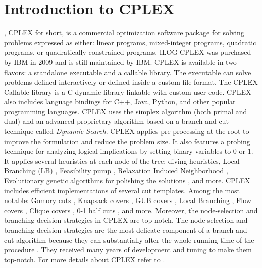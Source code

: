 \chapter{Introduction to CPLEX}
\label{sec:introduction-to-cplex}

,
CPLEX for short,
is a commercial optimization software package for solving problems expressed as either:
linear programs, mixed-integer programs, quadratic programs, or quadratically constrained programs.
ILOG CPLEX was purchased by IBM in 2009 and is still maintained by IBM.
CPLEX is available in two flavors: a standalone executable and a callable library.
The executable can solve problems defined interactively or defined inside a custom file format.
The CPLEX Callable library is a C dynamic library linkable with custom user code.
CPLEX also includes language bindings for C++, Java, Python, and other popular programming languages.
CPLEX uses the simplex algorithm (both primal and dual)
and an advanced proprietary algorithm based on a branch-and-cut technique called \textit{Dynamic Search}.
CPLEX applies pre-processing at the root to improve the formulation and reduce the problem size.
It also features a probing technique for analyzing logical implications by setting binary variables to $0$ or $1$.
It applies several heuristics at each node of the tree: diving heuristics, Local Branching (LB) \parencite{fischetti2003}, Feasibility pump \parencite{fischetti2005}, Relaxation Induced Neighborhood \parencite{danna2005}, Evolutionary genetic algorithms for polishing the solutions \parencite{rothberg2007}, and more.
CPLEX includes efficient implementations of several cut templates.
Among the most notable: Gomory cuts \parencite{chvatal1973}, Knapsack covers \parencite{letchford2020lifting}, GUB covers \parencite{wolsey1990valid}, Local Branching \parencite{fischetti2003}, Flow covers \parencite{padberg1985valid}, Clique covers \parencite{brigham1983clique}, 0-1 half cuts \parencite{caprara1996}, and more.
Moreover, the node-selection and branching decision strategies in CPLEX are top-notch.
The node-selection and branching decision strategies
are the most delicate component of a branch-and-cut algorithm
because they can substantially alter the whole running time of the procedure \parencite{lodi2013performance}.
They received many years of development and tuning to make them top-notch.
For more details about CPLEX refer to \textcite{lima2010, lodi2013heuristic}.


